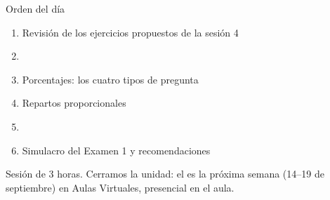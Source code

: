 \documentclass[aspectratio=169,10pt]{beamer}
\begin{document}
\portada

\begin{frame}{Orden del día}
  \begin{enumerate}
    \item Revisión de los ejercicios propuestos de la sesión 4
    \item {}
    \item Porcentajes: los cuatro tipos de pregunta
    \item Repartos proporcionales
    \item {}
    \item Simulacro del Examen 1 y recomendaciones
  \end{enumerate}

  \vspace{0.25cm}
  {\footnotesize\color{uniGris} Sesión de 3 horas. Cerramos la unidad: el
   es la próxima semana (14--19 de septiembre) en
  Aulas Virtuales, presencial en el aula.}
\end{frame}

\end{document}
